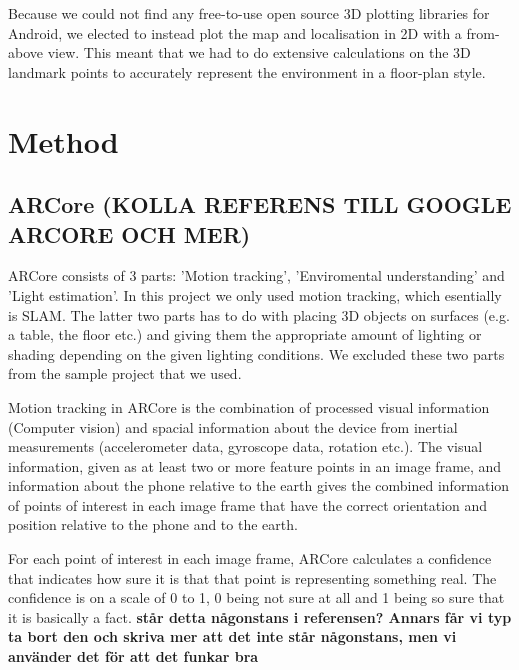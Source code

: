 \documentclass{article}
\begin{document}
Because we could not find any free-to-use open source 3D plotting libraries for Android, we elected to instead plot the map and localisation in 2D with a from-above view. This meant that we had to do extensive calculations on the 3D landmark points to accurately represent the environment in a floor-plan style.



\section{Method}
\subsection{ARCore (KOLLA REFERENS TILL GOOGLE ARCORE OCH MER)}



ARCore consists of 3 parts: 'Motion tracking', 'Enviromental understanding' and 'Light estimation'. In this project we only used motion tracking, which esentially is SLAM. The latter two parts has to do with placing 3D objects on surfaces (e.g. a table, the floor etc.) and giving them the appropriate amount of lighting or shading depending on the given lighting conditions. We excluded these two parts from the sample project that we used. \cite{ARCore}

Motion tracking in ARCore is the combination of processed visual information (Computer vision) and spacial information about the device from inertial measurements (accelerometer data, gyroscope data, rotation etc.). The visual information, given as at least two or more feature points in an image frame, and information about the phone relative to the earth gives the combined information of points of interest in each image frame that have the correct orientation and position relative to the phone and to the earth. \cite{ARCore}

For each point of interest in each image frame, ARCore calculates a confidence that indicates how sure it is that that point is representing something real. The confidence is on a scale of 0 to 1, 0 being not sure at all and 1 being so sure that it is basically a fact. \textbf{står detta någonstans i referensen? Annars får vi typ ta bort den och skriva mer att det inte står någonstans, men vi använder det för att det funkar bra} \cite{ARCore}
\end{document}
